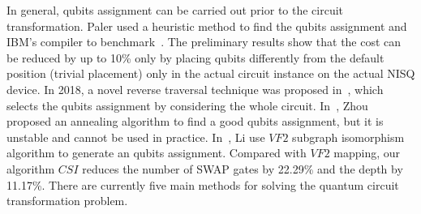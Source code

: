 \documentclass[runningheads]{llncs}
\begin{document}
In general, qubits assignment can be carried out prior to the circuit transformation. Paler used a heuristic method to find the qubits assignment and IBM's compiler to benchmark~\cite{Paler2018}. The preliminary results show that the cost can be reduced by up to 10\% only by placing qubits differently from the default position (trivial placement) only in the actual circuit instance on the actual NISQ device. In 2018, a novel reverse traversal technique was proposed in~\cite{Li2018}, which selects the qubits assignment by considering the whole circuit. In~\cite{Xiangzhen2020}, Zhou proposed an annealing algorithm to find a good qubits assignment, but it is unstable and cannot be used in practice. In~\cite{2020Qubit}, Li use $VF2$ subgraph isomorphism algorithm to generate an qubits assignment. Compared with $VF2$ mapping, our algorithm $CSI$ reduces the number of SWAP gates by 22.29\% and the depth by 11.17\%.
There are currently five main methods for solving the quantum circuit transformation problem.
\end{document}
